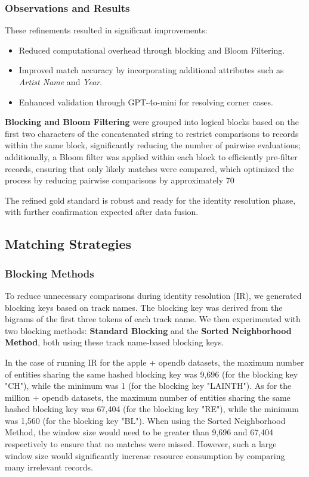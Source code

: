\documentclass[runningheads]{llncs}
\begin{document}
\subsubsection*{Observations and Results}
These refinements resulted in significant improvements:
\begin{itemize}
    \item Reduced computational overhead through blocking and Bloom Filtering.
    \item Improved match accuracy by incorporating additional attributes such as \textit{Artist Name} and \textit{Year}.
    \item Enhanced validation through GPT-4o-mini for resolving corner cases.
\end{itemize}
\textbf{Blocking and Bloom Filtering} were grouped into logical blocks based on the first two characters of the concatenated string to restrict comparisons to records within the same block, significantly reducing the number of pairwise evaluations; additionally, a Bloom filter was applied within each block to efficiently pre-filter records, ensuring that only likely matches were compared, which optimized the process by reducing pairwise comparisons by approximately 70%

The refined gold standard is robust and ready for the identity resolution phase, with further confirmation expected after data fusion.

\subsection{Matching Strategies}
\subsubsection{Blocking Methods}

To reduce unnecessary comparisons during identity resolution (IR), we generated blocking keys based on track names. The blocking key was derived from the bigrams of the first three tokens of each track name. We then experimented with two blocking methods: \textbf{Standard Blocking} and the \textbf{Sorted Neighborhood Method}, both using these track name-based blocking keys.

In the case of running IR for the apple + opendb datasets, the maximum number of entities sharing the same hashed blocking key was 9,696 (for the blocking key "CH"), while the minimum was 1 (for the blocking key "LAINTH"). As for the million + opendb datasets, the maximum number of entities sharing the same hashed blocking key was 67,404 (for the blocking key "RE"), while the minimum was 1,560 (for the blocking key "BL"). When using the Sorted Neighborhood Method, the window size would need to be greater than 9,696 and 67,404 respectively to ensure that no matches were missed. However, such a large window size would significantly increase resource consumption by comparing many irrelevant records.
\end{document}
